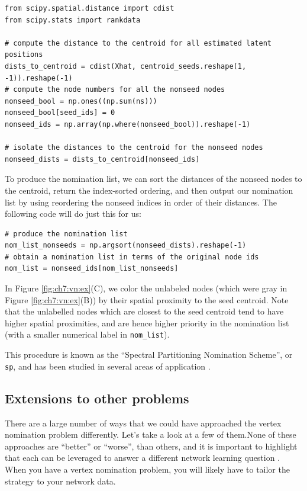 \begin{lstlisting}[style=python]
from scipy.spatial.distance import cdist
from scipy.stats import rankdata

# compute the distance to the centroid for all estimated latent positions
dists_to_centroid = cdist(Xhat, centroid_seeds.reshape(1, -1)).reshape(-1)
# compute the node numbers for all the nonseed nodes
nonseed_bool = np.ones((np.sum(ns)))
nonseed_bool[seed_ids] = 0
nonseed_ids = np.array(np.where(nonseed_bool)).reshape(-1)

# isolate the distances to the centroid for the nonseed nodes
nonseed_dists = dists_to_centroid[nonseed_ids]
\end{lstlisting}

To produce the nomination list, we can sort the distances of the nonseed nodes to the centroid, return the index-sorted ordering, and then output our nomination list by using reordering the nonseed indices in order of their distances. The following code will do just this for us:


\begin{lstlisting}[style=python]
# produce the nomination list
nom_list_nonseeds = np.argsort(nonseed_dists).reshape(-1)
# obtain a nomination list in terms of the original node ids
nom_list = nonseed_ids[nom_list_nonseeds]
\end{lstlisting}

In Figure \ref{fig:ch7:vn:ex}(C), we color the unlabeled nodes (which were gray in Figure \ref{fig:ch7:vn:ex}(B)) by their spatial proximity to the seed centroid. Note that the unlabelled nodes which are closest to the seed centroid tend to have higher spatial proximities, and are hence higher priority in the nomination list (with a smaller numerical label in \texttt{nom\_list}).

This procedure is known as the ``Spectral Partitioning Nomination Scheme'', or \texttt{sp}, and has been studied in several areas of application \cite{Fishkind2015Sep,Yoder2018Feb}.

\subsection{Extensions to other problems}

There are a large number of ways that we could have approached the vertex nomination problem differently. Let's take a look at a few of them.None of these approaches are ``better'' or ``worse'', than others, and it is important to highlight that each can be leveraged to answer a different network learning question \cite{Coppersmith2012Jan,Coppersmith2014Mar,Yoder2018Feb,Fishkind2015Sep,Fishkind2019Mar}. When you have a vertex nomination problem, you will likely have to tailor the strategy to your network data.


